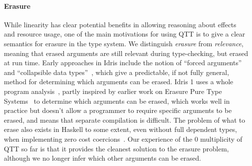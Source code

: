 \paragraph*{Erasure}

While linearity has clear potential benefits in allowing reasoning about
effects and resource usage, one of the main motivations for using QTT
is to give a clear semantics for erasure in the type system.
We distinguish \emph{erasure} from
\emph{relevance}, meaning that erased arguments are still relevant during
type-checking, but erased at run time.
Early approaches in Idris include the notion of ``forced arguments'' and
``collapsible data types''~\cite{Brady2005}, which give a predictable, if
not fully general, method for determining which arguments can be erased.
Idris 1 uses a whole program analysis~\cite{matus-draft}, partly inspired
by earlier work on Erasure Pure Type Systems~\cite{mishralinger-erasure}
to determine which arguments can be erased, which works well in practice but
doesn't allow a programmer to require specific arguments to be erased,
and means that separate compilation is difficult.
The problem of what to erase also exists in Haskell to some extent, even
without full dependent types, when implementing zero cost
coercions~\cite{rolehaskell}.
%
Our experience of the $0$ multiplicity of QTT so far is that it provides the 
cleanest solution to the erasure problem, although we no longer infer which
other arguments can be erased.

% 
% 

